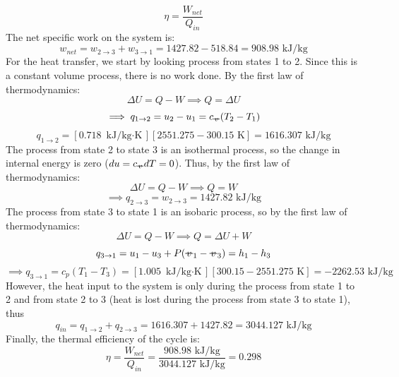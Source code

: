 \documentclass[12pt]{article}
\newcommand{\svol}{%
  \mathord{\text{\ooalign{%
    \hfil$v$\hfil\cr
    \hfil\rule[0.6ex]{0.8em}{0.5pt}\hfil
  }}}%
}
\begin{document}
\[\eta = \frac{W_{net}}{Q_{in}}\]
The net specific work on the system is:
\[w_{net} = w_{2\to3} + w_{3\to1} = 1427.82 - 518.84 = 908.98\text{ kJ/kg}\]
For the heat transfer, we start by looking process from states 1 to 2. Since this is a constant volume process, there is no work done. By the first law of thermodynamics:
\[\Delta U = Q - W \implies Q = \Delta U\]
\[\implies q_{1\to2} = u_2 - u_1 = c_{\svol} (T_2 - T_1)\]
\[q_{1\to2} = [0.718\text{ kJ/kg$\cdot$K}][2551.275 - 300.15\text{ K}] = 1616.307\text{ kJ/kg}\]
The process from state 2 to state 3 is an isothermal process, so the change in internal energy is zero ($du = c_{\svol} dT = 0$). Thus, by the first law of thermodynamics:
\[\Delta U = Q - W \implies Q = W\]
\[\implies q_{2\to3} = w_{2\to3} = 1427.82\text{ kJ/kg}\]
The process from state 3 to state 1 is an isobaric process, so by the first law of thermodynamics:
\[\Delta U = Q - W \implies Q = \Delta U + W\]
\[q_{3\to1} = u_1 - u_3 + P(\svol_1 - \svol_3) = h_1 - h_3\]
\[\implies q_{3\to1} = c_p (T_1 - T_3) = [1.005\text{ kJ/kg$\cdot$K}][300.15 - 2551.275\text{ K}] = -2262.53\text{ kJ/kg}\]
However, the heat input to the system is only during the process from state 1 to 2 and from state 2 to 3 (heat is lost during the process from state 3 to state 1), thus
\[q_{in} = q_{1\to2} + q_{2\to3} = 1616.307 + 1427.82 = 3044.127\text{ kJ/kg}\]
Finally, the thermal efficiency of the cycle is:
\[\eta = \frac{W_{net}}{Q_{in}} = \frac{908.98\text{ kJ/kg}}{3044.127\text{ kJ/kg}} = \boxed{0.298}\]
\end{document}
